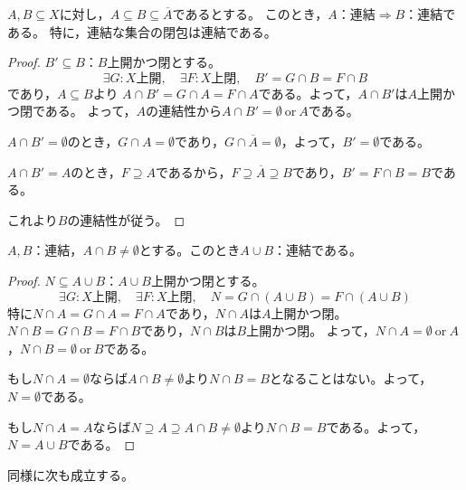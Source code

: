 \documentclass[uplatex]{jsarticle}
\begin{document}
\begin{prop}
  $A, B \subseteq X$に対し，$A \subseteq B \subseteq \overline{A}$であるとする。
  このとき，$A$：連結$\Longrightarrow B$：連結である。
  特に，連結な集合の閉包は連結である。
\end{prop}

\begin{proof}
  $B' \subseteq B$：$B$上開かつ閉とする。
  \begin{equation}
    \exists G: X\text{上開},\quad \exists F: X\text{上閉}, \quad B' = G \cap B = F \cap B
  \end{equation}
  であり，$A \subseteq B$より
  $A \cap B' = G \cap A = F \cap A$である。よって，$A \cap B'$は$A$上開かつ閉である。
  よって，$A$の連結性から$A \cap B' = \emptyset \: \text{or} \: A$である。

  $A \cap B' = \emptyset$のとき，$G \cap A = \emptyset$であり，$G \cap \overline{A} = \emptyset$，よって，$B' = \emptyset$である。

  $A \cap B' = A$のとき，$F \supseteq A$であるから，$F \supseteq \overline{A} \supseteq B$であり，$B' = F \cap B = B$である。

  これより$B$の連結性が従う。
\end{proof}

\begin{prop}
  \label{prop:renketu.union}
  $A,B$：連結，$A \cap B \neq \emptyset$とする。このとき$A \cup B$：連結である。
\end{prop}

\begin{proof}
  $N \subseteq A \cup B$：$A \cup B$上開かつ閉とする。
  \begin{equation}
    \exists G: X\text{上開},\quad \exists F: X\text{上閉}, \quad N = G \cap (A \cup B) = F \cap (A \cup B)
  \end{equation}
  特に$N \cap A = G \cap A = F \cap A$であり，$N \cap A$は$A$上開かつ閉。
  $N \cap B = G \cap B = F \cap B$であり，$N \cap B$は$B$上開かつ閉。
  よって，$N \cap A = \emptyset \: \text{or} \: A$，$N \cap B = \emptyset \: \text{or} \: B$である。

  もし$N \cap A = \emptyset$ならば$A \cap B \neq \emptyset$より$N \cap B = B$となることはない。よって，$N = \emptyset$である。

  もし$N \cap A = A$ならば$N \supseteq A \supseteq A \cap B \neq \emptyset$より$N \cap B = B$である。よって，$N = A \cup B$である。
\end{proof}

同様に次も成立する。
\end{document}
